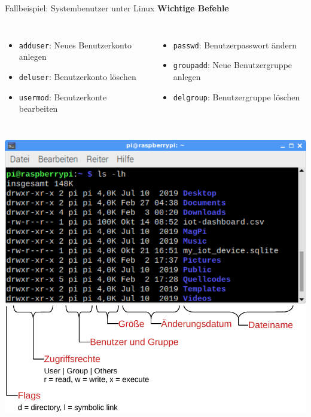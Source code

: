 {\begin{frame}[allowframebreaks]{Fallbeispiel: Systembenutzer unter Linux}
    \medskip
    \textbf{Wichtige Befehle}
    {
        \setlength{\leftmargini}{1.2em}
        \begin{columns}[T, onlytextwidth]
            \begin{itemize}
                \item \texttt{adduser}: Neues Benutzerkonto anlegen
                \item \texttt{deluser}: Benutzerkonto löschen
                \item \texttt{usermod}: Benutzerkonte bearbeiten
            \end{itemize}

            \begin{itemize}
                \item \texttt{passwd}: Benutzerpasswort ändern
                \item \texttt{groupadd}: Neue Benutzergruppe anlegen
                \item \texttt{delgroup}: Benutzergruppe löschen
            \end{itemize}
        \end{columns}
    }

    \framebreak

    \begin{columns}[onlytextwidth]
        \includegraphics[width=\textwidth]{img/rechte-dateizugriff}


\end{columns}
\end{frame}}
